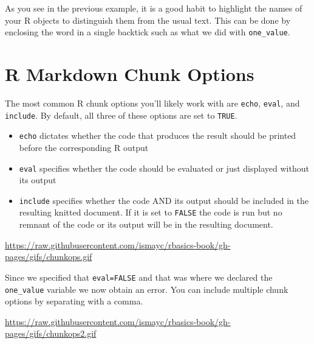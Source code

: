 \documentclass[]{tufte-book}
\begin{document}
As you see in the previous example, it is a good habit to highlight the
names of your R objects to distinguish them from the usual text. This
can be done by enclosing the word in a single backtick such as what we
did with \texttt{one\_value}.

\section{R Markdown Chunk Options}\label{r-markdown-chunk-options}

The most common R chunk options you'll likely work with are
\texttt{echo}, \texttt{eval}, and \texttt{include}. By default, all
three of these options are set to \texttt{TRUE}.

\begin{itemize}
\item
  \texttt{echo} dictates whether the code that produces the result
  should be printed before the corresponding R output
\item
  \texttt{eval} specifies whether the code should be evaluated or just
  displayed without its output
\item
  \texttt{include} specifies whether the code AND its output should be
  included in the resulting knitted document. If it is set to
  \texttt{FALSE} the code is run but no remnant of the code or its
  output will be in the resulting document.
\end{itemize}

\vspace{0.1in}

\begin{center}\footnotesize{\url{https://raw.githubusercontent.com/ismayc/rbasics-book/gh-pages/gifs/chunkops.gif}}\end{center}

\vspace{0.1in}

Since we specified that \texttt{eval=FALSE} and that was where we
declared the \texttt{one\_value} variable we now obtain an error. You
can include multiple chunk options by separating with a comma.

\vspace{0.1in}

\begin{center}\footnotesize{\url{https://raw.githubusercontent.com/ismayc/rbasics-book/gh-pages/gifs/chunkops2.gif}}\end{center}

\vspace{0.1in}
\end{document}
